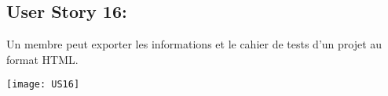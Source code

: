\newpage{}
\subsection{User Story 16:}
Un membre peut exporter les informations et le cahier de tests d'un projet au format HTML.


  \begin{center}
        \texttt{[image: US16]}
  \end{center}